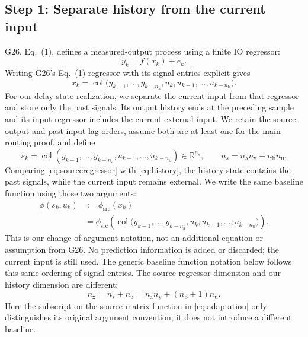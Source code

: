 \documentclass[11pt,a4paper]{article}
\newcommand{\R}{\mathbb R}
\newcommand{\col}{\operatorname{col}}
\newcommand{\src}{\mathrm{src}}
\begin{document}
\subsection*{Step 1: Separate history from the current input}
G26, Eq.\ (1), defines a measured-output process using a finite IO regressor:
\begin{equation}\label{eq:process}
y_k=f(x_k)+e_k.
\end{equation}
Writing G26's Eq.\ (1) regressor with its signal entries explicit gives
\begin{equation}\label{eq:sourceregressor}
x_k=\col\bigl(y_{k-1},\ldots,y_{k-n_{\mathrm a}},
u_k,u_{k-1},\ldots,u_{k-n_{\mathrm b}}\bigr).
\end{equation}
For our delay-state realization, we separate the current input from that regressor and store only the past signals. Its output history ends at the preceding sample and its input regressor includes the current external input. We retain the source output and past-input lag orders, assume both are at least one for the main routing proof, and define
\begin{equation}\label{eq:history}
s_k=\col(y_{k-1},\ldots,y_{k-n_{\mathrm a}},u_{k-1},\ldots,u_{k-n_{\mathrm b}})\in\R^{n_s},
\qquad n_s=n_{\mathrm a}n_{\mathrm y}+n_{\mathrm b}n_{\mathrm u}.
\end{equation}
Comparing \eqref{eq:sourceregressor} with \eqref{eq:history}, the history state contains the past signals, while the current input remains external. We write the same baseline function using those two arguments:
\begin{equation}\label{eq:adaptation}
\begin{aligned}
\phi(s_k,u_k)&:=\phi_{\src}(x_k)\\
&=\phi_{\src}\!\left(\col\bigl(y_{k-1},\ldots,y_{k-n_{\mathrm a}},
u_k,u_{k-1},\ldots,u_{k-n_{\mathrm b}}\bigr)\right).
\end{aligned}
\end{equation}
This is our change of argument notation, not an additional equation or assumption from G26. No prediction information is added or discarded; the current input is still used. The generic baseline function notation below follows this same ordering of signal entries.
The source regressor dimension and our history dimension are different:
\begin{equation}\label{eq:regressordimension}
n_{\mathrm x}=n_s+n_{\mathrm u}
=n_{\mathrm a}n_{\mathrm y}+(n_{\mathrm b}+1)n_{\mathrm u}.
\end{equation}
Here the subscript on the source matrix function in \eqref{eq:adaptation} only distinguishes its original argument convention; it does not introduce a different baseline.
\end{document}
